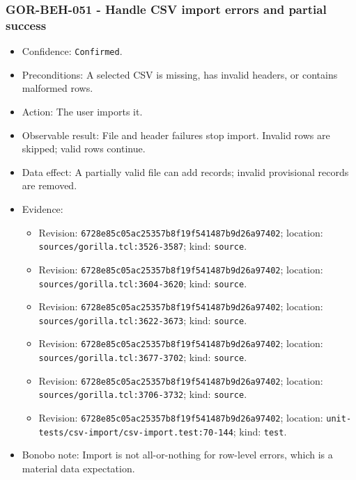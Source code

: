 \documentclass[
  letterpaper,
]{article}
\newcommand{\passthrough}[1]{#1}
\providecommand{\tightlist}{%
  \setlength{\itemsep}{0pt}\setlength{\parskip}{0pt}}
\begin{document}
\subsubsection{GOR-BEH-051 - Handle CSV import errors and partial
success}\label{gor-beh-051---handle-csv-import-errors-and-partial-success}

\begin{itemize}
\tightlist
\item
  Confidence: \passthrough{\lstinline!Confirmed!}.
\item
  Preconditions: A selected CSV is missing, has invalid headers, or contains malformed rows.
\item
  Action: The user imports it.
\item
  Observable result: File and header failures stop import. Invalid rows are skipped; valid rows continue.
\item
  Data effect: A partially valid file can add records; invalid provisional records are removed.
\item
  Evidence:

  \begin{itemize}
  \tightlist
  \item
    Revision: \nolinkurl{6728e85c05ac25357b8f19f541487b9d26a97402}; location: \nolinkurl{sources/gorilla.tcl:3526-3587};
    kind: \passthrough{\lstinline!source!}.
  \item
    Revision: \nolinkurl{6728e85c05ac25357b8f19f541487b9d26a97402}; location: \nolinkurl{sources/gorilla.tcl:3604-3620};
    kind: \passthrough{\lstinline!source!}.
  \item
    Revision: \nolinkurl{6728e85c05ac25357b8f19f541487b9d26a97402}; location: \nolinkurl{sources/gorilla.tcl:3622-3673};
    kind: \passthrough{\lstinline!source!}.
  \item
    Revision: \nolinkurl{6728e85c05ac25357b8f19f541487b9d26a97402}; location: \nolinkurl{sources/gorilla.tcl:3677-3702};
    kind: \passthrough{\lstinline!source!}.
  \item
    Revision: \nolinkurl{6728e85c05ac25357b8f19f541487b9d26a97402}; location: \nolinkurl{sources/gorilla.tcl:3706-3732};
    kind: \passthrough{\lstinline!source!}.
  \item
    Revision: \nolinkurl{6728e85c05ac25357b8f19f541487b9d26a97402}; location:
    \nolinkurl{unit-tests/csv-import/csv-import.test:70-144}; kind: \passthrough{\lstinline!test!}.
  \end{itemize}
\item
  Bonobo note: Import is not all-or-nothing for row-level errors, which is a material data expectation.
\end{itemize}
\end{document}
